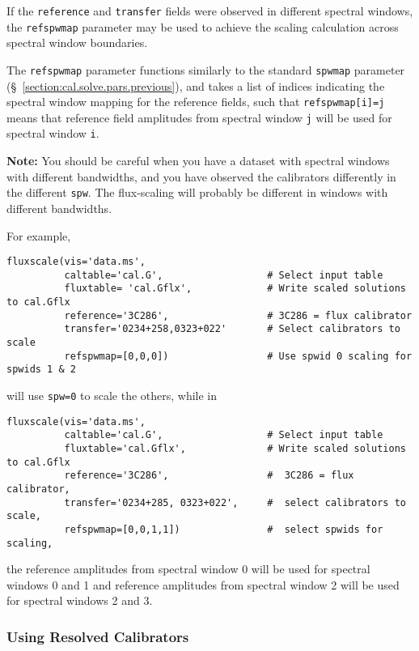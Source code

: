 If the {\tt reference} and {\tt transfer} fields were observed in different
spectral windows, the {\tt refspwmap} parameter may be used
to achieve the scaling calculation across spectral window boundaries.

The {\tt refspwmap} parameter functions similarly to the standard
{\tt spwmap} parameter (\S~\ref{section:cal.solve.pars.previous}),
and takes a list of indices
indicating the spectral window mapping for the reference fields,
such that {\tt refspwmap[i]=j} means that reference field amplitudes
from spectral window {\tt j} will be used for spectral window {\tt i}.

{\bf Note:} You should be careful when you have a dataset with
spectral windows with different bandwidths, and you
have observed the calibrators differently in the different {\tt spw}.
The flux-scaling will probably be different in windows with different
bandwidths.

For example,
\small
\begin{verbatim}
fluxscale(vis='data.ms',
          caltable='cal.G',                  # Select input table
          fluxtable= 'cal.Gflx',             # Write scaled solutions to cal.Gflx
          reference='3C286',                 # 3C286 = flux calibrator
          transfer='0234+258,0323+022'       # Select calibrators to scale
          refspwmap=[0,0,0])                 # Use spwid 0 scaling for spwids 1 & 2
\end{verbatim}
\normalsize
will use {\tt spw=0} to scale the others, while in
\small
\begin{verbatim}
fluxscale(vis='data.ms',
          caltable='cal.G',                  # Select input table
          fluxtable='cal.Gflx',              # Write scaled solutions to cal.Gflx
          reference='3C286',                 #  3C286 = flux calibrator,
          transfer='0234+285, 0323+022',     #  select calibrators to scale,
          refspwmap=[0,0,1,1])               #  select spwids for scaling,
\end{verbatim}
\normalsize
the reference amplitudes from spectral window 0 will be
used for spectral windows 0 and 1 and reference amplitudes from
spectral window 2 will be used for spectral windows 2 and 3.

\subsubsection{Using Resolved Calibrators}
\label{section:cal.solve.fluxscale.resolved}


